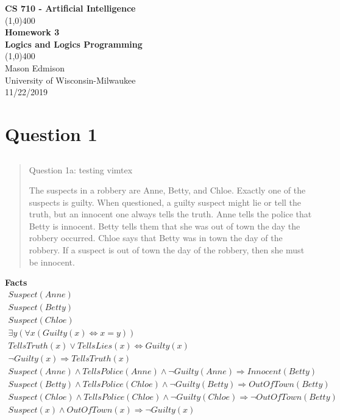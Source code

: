 \documentclass[11pt]{article}
\begin{document}
\begin{titlepage}
\begin{center}
\Large{\textbf{CS 710 - Artificial Intelligence}} \\
\vfill
\line(1,0){400} \\
\huge{\textbf{Homework 3}} \\
\Large{\textbf{Logics and Logics Programming}} \\
\line(1,0){400}\\
\vfill
Mason Edmison\\
University of Wisconsin-Milwaukee\\
11/22/2019
\end{center}
\end{titlepage}

\section{Question 1}
\subsection{}
\begin{quote}
Question 1a: testing vimtex

The suspects in a robbery are Anne, Betty, and Chloe.
Exactly one of the suspects is guilty.
When questioned, a guilty suspect might lie or tell the truth, but an innocent one always tells the truth.
Anne tells the police that Betty is innocent.
Betty tells them that she was out of town the day the robbery occurred.
Chloe says that Betty was in town the day of the robbery.
If a suspect is out of town the day of the robbery, then she must be innocent.
\end{quote}

\large \textbf{Facts}
\begin{align}
Suspect(Anne) \\
Suspect(Betty) \\
Suspect(Chloe) \\
\exists y(\forall x(Guilty(x) \Leftrightarrow x=y)) \\ 
TellsTruth(x) \lor TellsLies(x) \Leftrightarrow Guilty(x) \\
\lnot Guilty(x) \Rightarrow TellsTruth(x) \\
Suspect(Anne) \land TellsPolice(Anne) \land \lnot Guilty(Anne) \Rightarrow Innocent(Betty) \\ 
Suspect(Betty) \land TellsPolice(Chloe) \land \lnot Guilty(Betty) \Rightarrow OutOfTown(Betty) \\  
Suspect(Chloe) \land TellsPolice(Chloe) \land \lnot Guilty(Chloe) \Rightarrow \lnot OutOfTown(Betty) \\  
Suspect(x) \land OutOfTown(x) \Rightarrow \lnot Guilty(x)
\end{align}
\end{document}
